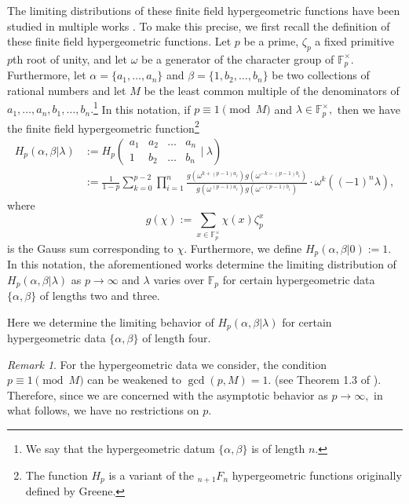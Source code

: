 \documentclass[12pt]{amsart}
\theoremstyle{definition}
\theoremstyle{remark}
\newtheorem{remark}[theorem]{Remark}
\numberwithin{equation}{section}
\def\F{{\mathbb F}}
\def\F{\mathbb{F}}
\begin{document}
The limiting distributions of these finite field hypergeometric functions have been studied in multiple works \cite{HGFDistributionOnoSaikia, 3F2Explicit, ono2024distributionhessianvaluesgaussian, grove2024hypergeometricmomentshecketrace}. To make this precise, we first recall the definition of these finite field hypergeometric functions. Let $p$ be a prime, $\zeta_p$ a fixed primitive $p$th root of unity, and let $\omega$ be a generator of the character group of $\F_p^\times.$ Furthermore, let $\alpha=\{a_1,\ldots,a_n\}$ and $\beta=\{1,b_2,\ldots,b_n\}$ be two collections of rational numbers and let $M$ be the least common multiple of the denominators of $a_1,\ldots,a_n,b_1,\ldots,b_n.$\footnote{We say that the hypergeometric datum $\{\alpha,\beta\}$ is of length $n.$} In this notation, if $p\equiv 1\pmod M$ and $\lambda\in\F_p^\times,$ then we have \cite{McCarthyTransformations} the finite field hypergeometric function\footnote{The function $H_p$ is a variant of the ${_{n+1}F_n}$ hypergeometric functions originally defined by Greene.}
\begin{align*}
H_p(\alpha,\beta|\lambda)&:=H_p\left(\begin{array}{cccc}
    a_1 & a_2  & \ldots & a_n  \\
     1 &  b_2 & \ldots &  b_n
\end{array}\bigg|\ \lambda\right) \\
&:=\frac{1}{1-p}\sum\limits_{k=0}^{p-2}\prod\limits_{i=1}^n\frac{g(\omega^{k+(p-1)a_i})g(\omega^{-k-(p-1)b_i})}{g(\omega^{(p-1)a_i})g(\omega^{-(p-1)b_i})}\cdot \omega^k((-1)^n\lambda),
\end{align*}
where
$$
g(\chi) := \sum\limits_{x\in\F_p^\times}\chi(x)\zeta_p^{x}
$$
is the Gauss sum corresponding to $\chi.$ Furthermore, we define $H_p(\alpha,\beta|0):=1.$ In this notation, the aforementioned works determine the limiting distribution of $H_p(\alpha,\beta|\lambda)$ as $p\to\infty$ and $\lambda$ varies over $\F_p$ for certain hypergeometric data $\{\alpha,\beta\}$ of lengths two and three.

Here we determine the limiting behavior of $H_p(\alpha,\beta|\lambda)$ for certain hypergeometric data $\{\alpha,\beta\}$ of length four.

\begin{remark}
For the hypergeometric data we consider, the condition $p\equiv 1\pmod M$ can be weakened to $\gcd(p,M)=1.$ (see Theorem 1.3 of \cite{BCM}). Therefore, since we are concerned with the asymptotic behavior as $p\to\infty,$ in what follows, we have no restrictions on $p.$ 
\end{remark} 
\end{document}
